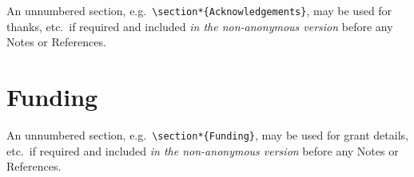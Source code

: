\documentclass[]{interact}
\theoremstyle{plain}%
\theoremstyle{definition}
\theoremstyle{remark}
\begin{document}
An unnumbered section,
e.g.~\texttt{\textbackslash{}section*\{Acknowledgements\}}, may be used
for thanks, etc.~if required and included \emph{in the non-anonymous
version} before any Notes or References.

\hypertarget{funding}{%
\section*{Funding}\label{funding}}

An unnumbered section,
e.g.~\texttt{\textbackslash{}section*\{Funding\}}, may be used for grant
details, etc.~if required and included \emph{in the non-anonymous
version} before any Notes or References.






\end{document}
